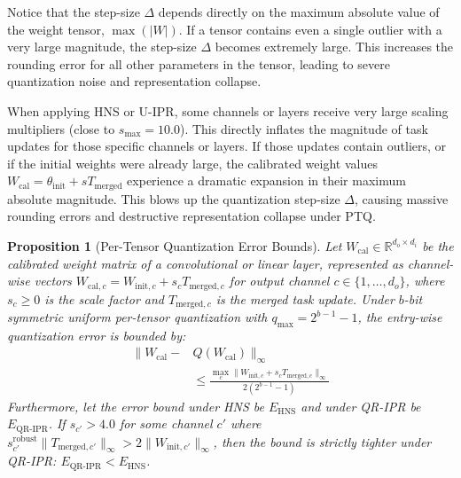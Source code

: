 \documentclass{article}
\theoremstyle{plain}
\newtheorem{proposition}[theorem]{Proposition}
\theoremstyle{definition}
\theoremstyle{remark}
\begin{document}
Notice that the step-size $\Delta$ depends directly on the maximum absolute value of the weight tensor, $\max(|W|)$. If a tensor contains even a single outlier with a very large magnitude, the step-size $\Delta$ becomes extremely large. This increases the rounding error for all other parameters in the tensor, leading to severe quantization noise and representation collapse.

When applying HNS or U-IPR, some channels or layers receive very large scaling multipliers (close to $s_{\text{max}} = 10.0$). This directly inflates the magnitude of task updates for those specific channels or layers. If those updates contain outliers, or if the initial weights were already large, the calibrated weight values $W_{\text{cal}} = \theta_{\text{init}} + s T_{\text{merged}}$ experience a dramatic expansion in their maximum absolute magnitude. This blows up the quantization step-size $\Delta$, causing massive rounding errors and destructive representation collapse under PTQ.

\begin{proposition}[Per-Tensor Quantization Error Bounds]
Let $W_{\text{cal}} \in \mathbb{R}^{d_o \times d_i}$ be the calibrated weight matrix of a convolutional or linear layer, represented as channel-wise vectors $W_{\text{cal}, c} = W_{\text{init}, c} + s_c T_{\text{merged}, c}$ for output channel $c \in \{1, \dots, d_o\}$, where $s_c \ge 0$ is the scale factor and $T_{\text{merged}, c}$ is the merged task update. Under $b$-bit symmetric uniform per-tensor quantization with $q_{\text{max}} = 2^{b-1}-1$, the entry-wise quantization error is bounded by:
\begin{align}
    \|W_{\text{cal}} - &Q(W_{\text{cal}})\|_{\infty} \nonumber \\
    &\le \frac{\max_{c} \|W_{\text{init}, c} + s_c T_{\text{merged}, c}\|_{\infty}}{2(2^{b-1}-1)}
\end{align}
Furthermore, let the error bound under HNS be $E_{\text{HNS}}$ and under QR-IPR be $E_{\text{QR-IPR}}$. If $s_{c'} > 4.0$ for some channel $c'$ where $s_{c'}^{\text{robust}} \|T_{\text{merged}, c'}\|_{\infty} > 2 \|W_{\text{init}, c'}\|_{\infty}$, then the bound is strictly tighter under QR-IPR: $E_{\text{QR-IPR}} < E_{\text{HNS}}$.
\end{proposition}
\end{document}
